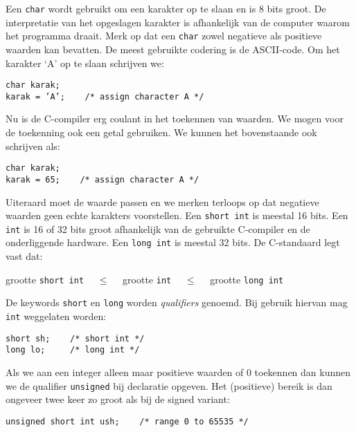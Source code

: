 Een \texttt{char} wordt gebruikt om een karakter op te slaan en is 8 bits groot. De interpretatie van het opgeslagen karakter is afhankelijk van de computer waarom het programma draait. Merk op dat een \texttt{char} zowel negatieve als positieve waarden kan bevatten. De meest gebruikte codering is de ASCII-code. Om het karakter `A' op te slaan schrijven we:

\hspace*{1em}\texttt{char karak;}\\
\hspace*{1em}\texttt{karak = 'A'; \ \ \ /* assign character A */}

Nu is de C-compiler erg coulant in het toekennen van waarden. We mogen voor de toekenning ook een getal gebruiken. We kunnen het bovenstaande ook schrijven als:

\hspace*{1em}\texttt{char karak;}\\
\hspace*{1em}\texttt{karak = 65; \ \ \ /* assign character A */}

Uiteraard moet de waarde passen en we merken terloops op dat negatieve waarden geen echte karakters voorstellen. Een \texttt{short int} is meestal 16 bits. Een \texttt{int} is 16 of 32 bits groot afhankelijk van de gebruikte C-compiler en de onderliggende hardware. Een \texttt{long int} is meestal 32 bits. De C-standaard legt vast dat:

\hspace*{1em}grootte \texttt{short int} $\quad\leq\quad$ grootte \texttt{int} $\quad\leq\quad$ grootte \texttt{long int}

De keywords \texttt{short} en \texttt{long} worden \textsl{qualifiers} genoemd. Bij gebruik hiervan mag \texttt{int} weggelaten worden:

\hspace*{1em}\texttt{short sh; \ \ \ /* short int */}\\
\hspace*{1em}\texttt{long lo; \ \ \ \ /* long int */}

Als we aan een integer alleen maar positieve waarden of 0 toekennen dan kunnen we de qualifier \texttt{unsigned} bij declaratie opgeven. Het (positieve) bereik is dan ongeveer twee keer zo groot als bij de signed variant:

\hspace*{1em}\texttt{unsigned short int ush; \ \ \ /* range 0 to 65535 */}

